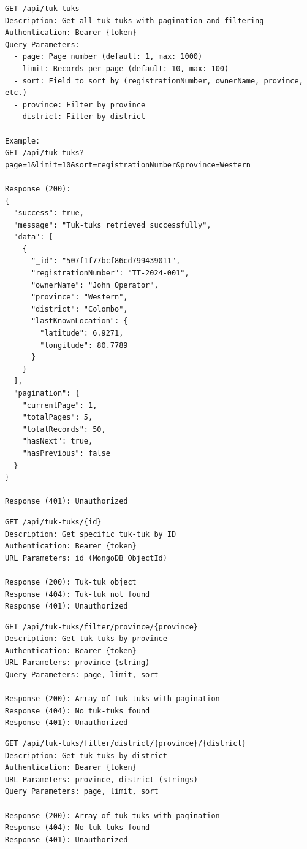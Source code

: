 \documentclass[12pt,a4paper]{article}
\begin{document}
\begin{verbatim}
GET /api/tuk-tuks
Description: Get all tuk-tuks with pagination and filtering
Authentication: Bearer {token}
Query Parameters:
  - page: Page number (default: 1, max: 1000)
  - limit: Records per page (default: 10, max: 100)
  - sort: Field to sort by (registrationNumber, ownerName, province, etc.)
  - province: Filter by province
  - district: Filter by district

Example:
GET /api/tuk-tuks?page=1&limit=10&sort=registrationNumber&province=Western

Response (200):
{
  "success": true,
  "message": "Tuk-tuks retrieved successfully",
  "data": [
    {
      "_id": "507f1f77bcf86cd799439011",
      "registrationNumber": "TT-2024-001",
      "ownerName": "John Operator",
      "province": "Western",
      "district": "Colombo",
      "lastKnownLocation": {
        "latitude": 6.9271,
        "longitude": 80.7789
      }
    }
  ],
  "pagination": {
    "currentPage": 1,
    "totalPages": 5,
    "totalRecords": 50,
    "hasNext": true,
    "hasPrevious": false
  }
}

Response (401): Unauthorized
\end{verbatim}

\begin{verbatim}
GET /api/tuk-tuks/{id}
Description: Get specific tuk-tuk by ID
Authentication: Bearer {token}
URL Parameters: id (MongoDB ObjectId)

Response (200): Tuk-tuk object
Response (404): Tuk-tuk not found
Response (401): Unauthorized
\end{verbatim}

\begin{verbatim}
GET /api/tuk-tuks/filter/province/{province}
Description: Get tuk-tuks by province
Authentication: Bearer {token}
URL Parameters: province (string)
Query Parameters: page, limit, sort

Response (200): Array of tuk-tuks with pagination
Response (404): No tuk-tuks found
Response (401): Unauthorized
\end{verbatim}

\begin{verbatim}
GET /api/tuk-tuks/filter/district/{province}/{district}
Description: Get tuk-tuks by district
Authentication: Bearer {token}
URL Parameters: province, district (strings)
Query Parameters: page, limit, sort

Response (200): Array of tuk-tuks with pagination
Response (404): No tuk-tuks found
Response (401): Unauthorized
\end{verbatim}
\end{document}
